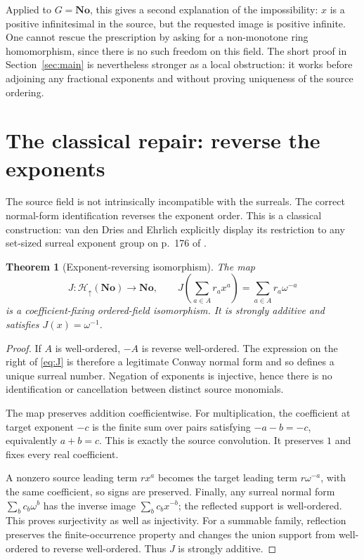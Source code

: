 \documentclass[11pt,letterpaper]{article}
\newtheorem{theorem}{Theorem}[section]
\theoremstyle{definition}
\theoremstyle{remark}
\newcommand{\No}{\mathbf{No}}
\newcommand{\Hfull}{\mathcal H_{\uparrow}(\No)}
\begin{document}
Applied to $G=\No$, this gives a second explanation of the impossibility:
$x$ is a positive infinitesimal in the source, but the requested image is
positive infinite. One cannot rescue the prescription by asking for a
non-monotone ring homomorphism, since there is no such freedom on this field.
The short proof in Section~\ref{sec:main} is nevertheless stronger as a local
obstruction: it works before adjoining any fractional exponents and without
proving uniqueness of the source ordering.

\section{The classical repair: reverse the exponents}\label{sec:repair}
The source field is not intrinsically incompatible with the surreals. The
correct normal-form identification reverses the exponent order. This is a
classical construction: van den Dries and Ehrlich explicitly display its
restriction to any set-sized surreal exponent group on p.~176 of
\citet{DriesEhrlich2001}.

\begin{theorem}[Exponent-reversing isomorphism]\label{thm:reversal}
The map
\begin{equation}\label{eq:J}
 J:\Hfull\longrightarrow\No,
 \qquad J\left(\sum_{a\in A}r_ax^a\right)
       =\sum_{a\in A}r_a\omega^{-a}
\end{equation}
is a coefficient-fixing ordered-field isomorphism. It is strongly additive
and satisfies $J(x)=\omega^{-1}$.
\end{theorem}
\begin{proof}
If $A$ is well-ordered, $-A$ is reverse well-ordered. The expression on the
right of \eqref{eq:J} is therefore a legitimate Conway normal form and so
defines a unique surreal number. Negation of exponents is injective, hence
there is no identification or cancellation between distinct source monomials.

The map preserves addition coefficientwise. For multiplication, the
coefficient at target exponent $-c$ is the finite sum over pairs satisfying
$-a-b=-c$, equivalently $a+b=c$. This is exactly the source convolution.
It preserves $1$ and fixes every real coefficient.

A nonzero source leading term $r x^a$ becomes the target leading term
$r\omega^{-a}$, with the same coefficient, so signs are preserved. Finally,
any surreal normal form $\sum_b c_b\omega^b$ has the inverse image
$\sum_b c_bx^{-b}$; the reflected support is well-ordered. This proves
surjectivity as well as injectivity. For a summable family, reflection
preserves the finite-occurrence property and changes the union support from
well-ordered to reverse well-ordered. Thus $J$ is strongly additive.
\end{proof}
\end{document}

